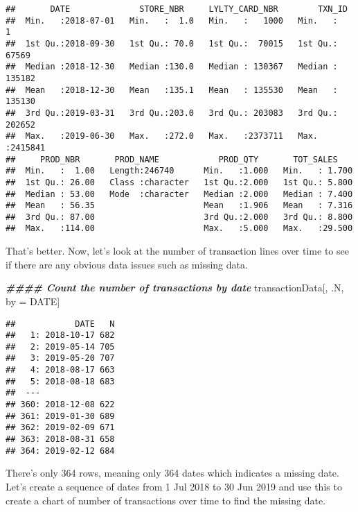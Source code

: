 \documentclass[
]{article}
\newenvironment{Shaded}{\begin{snugshade}}{\end{snugshade}}
\newcommand{\DocumentationTok}[1]{\textcolor[rgb]{0.56,0.35,0.01}{\textbf{\textit{#1}}}}
\newcommand{\NormalTok}[1]{#1}
\newcommand{\OtherTok}[1]{\textcolor[rgb]{0.56,0.35,0.01}{#1}}
\begin{document}
\begin{verbatim}
##       DATE              STORE_NBR     LYLTY_CARD_NBR        TXN_ID       
##  Min.   :2018-07-01   Min.   :  1.0   Min.   :   1000   Min.   :      1  
##  1st Qu.:2018-09-30   1st Qu.: 70.0   1st Qu.:  70015   1st Qu.:  67569  
##  Median :2018-12-30   Median :130.0   Median : 130367   Median : 135182  
##  Mean   :2018-12-30   Mean   :135.1   Mean   : 135530   Mean   : 135130  
##  3rd Qu.:2019-03-31   3rd Qu.:203.0   3rd Qu.: 203083   3rd Qu.: 202652  
##  Max.   :2019-06-30   Max.   :272.0   Max.   :2373711   Max.   :2415841  
##     PROD_NBR       PROD_NAME            PROD_QTY       TOT_SALES     
##  Min.   :  1.00   Length:246740      Min.   :1.000   Min.   : 1.700  
##  1st Qu.: 26.00   Class :character   1st Qu.:2.000   1st Qu.: 5.800  
##  Median : 53.00   Mode  :character   Median :2.000   Median : 7.400  
##  Mean   : 56.35                      Mean   :1.906   Mean   : 7.316  
##  3rd Qu.: 87.00                      3rd Qu.:2.000   3rd Qu.: 8.800  
##  Max.   :114.00                      Max.   :5.000   Max.   :29.500
\end{verbatim}

That's better. Now, let's look at the number of transaction lines over
time to see if there are any obvious data issues such as missing data.

\begin{Shaded}
\begin{Highlighting}[]
\DocumentationTok{\#\#\#\# Count the number of transactions by date}
\NormalTok{transactionData[, .N, by }\OtherTok{=}\NormalTok{ DATE]}
\end{Highlighting}
\end{Shaded}

\begin{verbatim}
##            DATE   N
##   1: 2018-10-17 682
##   2: 2019-05-14 705
##   3: 2019-05-20 707
##   4: 2018-08-17 663
##   5: 2018-08-18 683
##  ---               
## 360: 2018-12-08 622
## 361: 2019-01-30 689
## 362: 2019-02-09 671
## 363: 2018-08-31 658
## 364: 2019-02-12 684
\end{verbatim}

There's only 364 rows, meaning only 364 dates which indicates a missing
date. Let's create a sequence of dates from 1 Jul 2018 to 30 Jun 2019
and use this to create a chart of number of transactions over time to
find the missing date.
\end{document}
